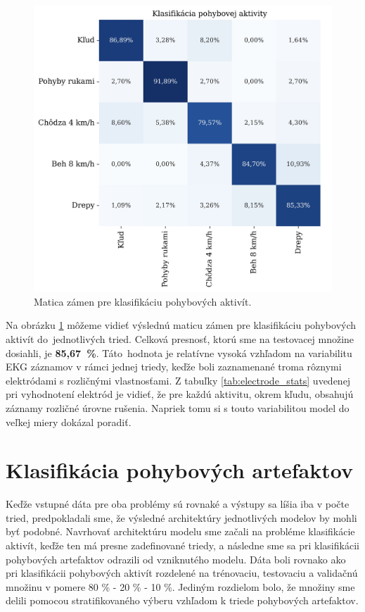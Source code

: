\begin{figure}[H]
    \centering    
    \includegraphics[scale=0.07]{img/confusion_matrix_activity.jpeg}
    \caption{Matica zámen pre klasifikáciu pohybových aktivít.}
    \label{fig:activity_classification}
\end{figure}

Na obrázku \ref{fig:activity_classification} môžeme vidieť výslednú maticu zámen pre klasifikáciu pohybových aktivít do~jednotlivých tried. Celková presnosť, ktorú sme na testovacej množine dosiahli, je \textbf{85,67~\%}. Táto~hodnota je relatívne vysoká vzhľadom na variabilitu EKG záznamov v rámci jednej triedy, keďže boli zaznamenané troma rôznymi elektródami s rozličnými vlastnosťami. Z tabuľky \ref{tab:electrode_stats} uvedenej pri vyhodnotení elektród je vidieť, že pre každú aktivitu, okrem kľudu, obsahujú záznamy rozličné úrovne rušenia. Napriek tomu si s touto variabilitou model do veľkej miery dokázal poradiť.


\section{Klasifikácia pohybových artefaktov}

Keďže vstupné dáta pre oba problémy sú rovnaké a výstupy sa líšia iba v počte tried, predpokladali sme, že výsledné architektúry jednotlivých modelov by mohli byť podobné. Navrhovať architektúru modelu sme začali na probléme klasifikácie aktivít, keďže ten má presne zadefinované triedy, a následne sme sa pri klasifikácii pohybových artefaktov odrazili od vzniknutého modelu. Dáta boli rovnako ako pri klasifikácii pohybových aktivít rozdelené na trénovaciu, testovaciu a validačnú množinu v pomere 80 \% -  20 \% - 10 \%. Jediným rozdielom bolo, že množiny sme delili pomocou stratifikovaného výberu vzhľadom k triede pohybových artefaktov.

